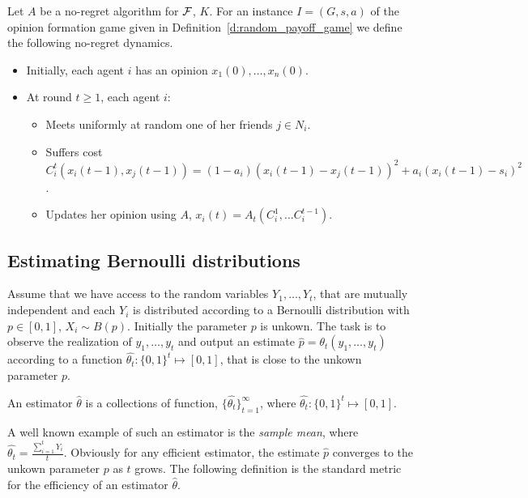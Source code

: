 \begin{definition} \label{d:noregret_dynamics}
  Let $A$ be a no-regret algorithm for $\mathcal{F}$, $K$.
  For an instance $I = (G, s, a)$ of the opinion formation game
  given in Definition~\ref{d:random_payoff_game} we define
  the following no-regret dynamics.
  \begin{itemize}
    \item Initially, each agent $i$ has an opinion $x_1(0),\ldots,x_n(0)$.

    \item At round $t \geq 1$, each agent $i$:
      \begin{itemize}
        \item Meets uniformly at random one of her friends $j \in N_i$.
        \item  Suffers cost
          \(
            C^t_i(x_i(t-1),x_{j}(t-1))=(1-a_i)(x_i(t-1)
            -x_j(t-1))^2 + a_i(x_i(t-1)-s_i)^2
          \).
        \item Updates her opinion using $A$,
          $x_i(t) = A_t(C^1_i, \ldots C^{t-1}_i)$.
      \end{itemize}
  \end{itemize}

\end{definition}

\subsection{Estimating Bernoulli distributions}

Assume that we have access to the random variables $Y_1,\ldots,Y_t$, that are
mutually independent and each
$Y_i$ is distributed according to a Bernoulli distribution with $p \in [0,1]$,
$X_i\sim B(p)$.  Initially the parameter $p$ is unkown. The task is to observe
the realization of $y_1,\ldots,y_t$ and output an estimate
$\hat{p}=\theta_t(y_1,\ldots,y_t)$ according to a function $\hat{\theta_t}:
\{0,1\}^t\mapsto [0,1]$, that is close to the unkown parameter $p$.

\begin{definition}
  An estimator $\hat{\theta}$ is a collections of function,
  $\{\hat{\theta_t}\}_{t=1}^{\infty}$, where
  $\hat{\theta_t}: \{0,1\}^t\mapsto [0,1]$.
\end{definition}

A well known example of such an estimator is the
\emph{sample mean}, where $\hat{\theta_t}=\frac{\sum_{i=1}^tY_i}{t}$.
\noindent Obviously for any efficient estimator, the estimate $\hat{p}$
converges to the unkown parameter $p$ as $t$ grows. The following definition is
the standard metric for the efficiency of an estimator $\hat{\theta}$.

